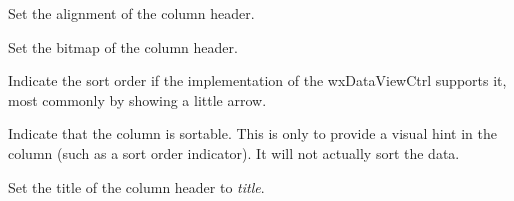 Set the alignment of the column header.

\label{wxdataviewcolumnsetbitmap}


Set the bitmap of the column header.

\label{wxdataviewcolumnsetsortorder}


Indicate the sort order if the implementation of the
wxDataViewCtrl supports it, most commonly by showing
a little arrow. 

\label{wxdataviewcolumnsetsortable}


Indicate that the column is sortable. This is only to provide a
visual hint in the column (such as a sort order indicator). It
will not actually sort the data. 

\label{wxdataviewcolumnsettitle}


Set the title of the column header to {\it title}.

